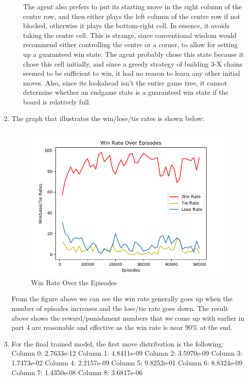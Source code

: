\documentclass[10pt,letterpaper]{article}
\begin{document}
\begin{enumerate}
\begin{enumerate}
			The agent also prefers to put its starting move in the right column of the centre row, and then either plays the left column of the centre row if not blocked, otherwise it plays the bottom-right cell.
			In essence, it avoids taking the centre cell.
			This is strange, since conventional wisdom would recommend either controlling the centre or a corner, to allow for setting up a guaranteed win state.
			The agent probably chose this state because it chose this cell initially, and since a greedy strategy of building 3-X chains seemed to be sufficient to win, it had no reason to learn any other initial moves.
			Also, since its lookahead isn't the entire game tree, it cannot determine whether an endgame state is a guaranteed win state if the board is relatively full.
		\end{enumerate}
		\item %
		The graph that illustrates the win/lose/tie rates is shown below:

		\begin{figure}[H]
				\centering
				\includegraphics[width=0.7\linewidth]{Part6LearningCurve.png}
				\caption{Win Rate Over the Episodes}
				\label{fig:part6}
		\end{figure}

		From the figure above we can see the win rate generally goes up when the number of episodes increases and the lose/tie rate goes down. The result above shows the reward/punishment numbers that we come up with earlier in part 4 are reasonable and effective as the win rate is near $90\%$ at the end.

		\item %
		For the final trained model, the first move distribution is the following:
Column 0: 2.7633e-12 \newline
Column 1: 4.8411e-09 \newline
Column 2: 3.5970e-09 \newline
Column 3: 1.7473e-02 \newline
Column 4: 2.2157e-09 \newline
Column 5: 9.8252e-01 \newline
Column 6: 8.8324e-09 \newline
Column 7: 1.4350e-08 \newline
Column 8: 3.6817e-06 \newline


\end{enumerate}
\end{document}
